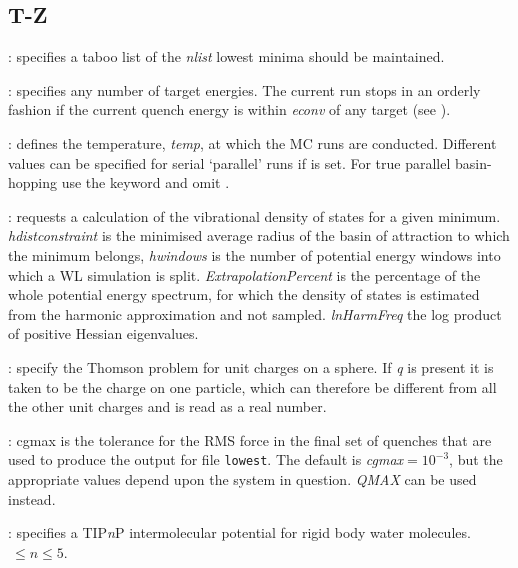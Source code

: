 \subsection{T-Z}
: specifies a taboo list of the {\it nlist\/} lowest minima should be maintained.

: specifies any number of target energies. 
The current run stops in an orderly
fashion if the current quench energy is within {\it econv\/} of any target (see {\/}).

: defines the temperature, {\it temp\/}, at which the 
MC runs are conducted. Different values can be specified for serial `parallel' runs if
{} is set.
For true parallel basin-hopping use the {\/} keyword and omit {\/}.

: requests a calculation of the vibrational density of
states for a given minimum. {\it hdistconstraint} is the minimised average radius of the basin of attraction to which the minimum
belongs, {\it hwindows} is the number of potential energy windows into which a WL simulation is split. {\it 
ExtrapolationPercent} is the percentage of the whole potential energy spectrum, for which the density of states is estimated from
the harmonic approximation and not sampled. {\it lnHarmFreq} the log product of positive Hessian
eigenvalues.

: specify the Thomson problem for unit charges on a sphere.
If {\it q\/} is present it is taken to be the charge on one particle, which can
therefore be different from all the other unit charges and is read as a real number.


: cgmax is the tolerance for the
RMS force in the final set of quenches that are used to produce
the output for file {\tt lowest}. The default is
{\it cgmax\/}$=10^{-3}$, but the appropriate values depend upon the system in question.
{\it QMAX} can be used instead.

: specifies a TIP{\it n\/}P intermolecular potential for rigid body water molecules.
$\ \le n \le 5$.

